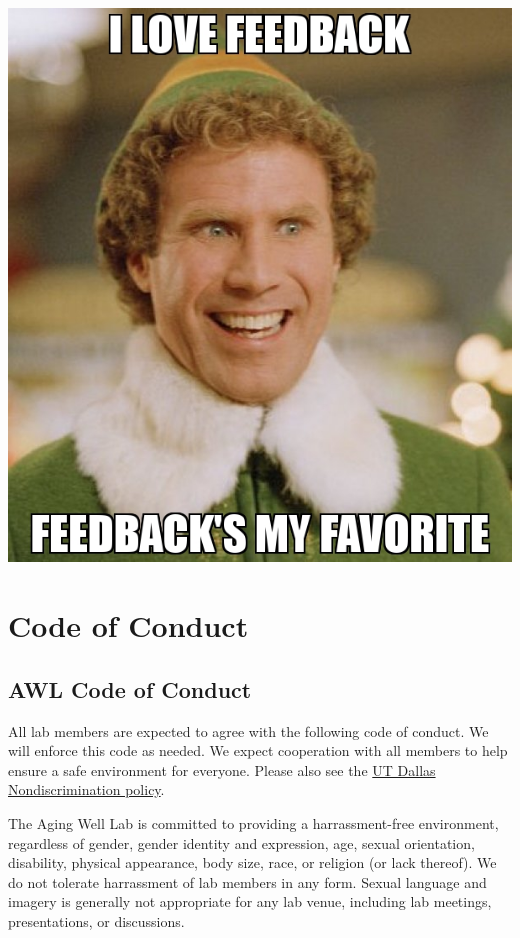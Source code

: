 \documentclass[
]{book}
\begin{document}
\includegraphics{images/i-love-feedback.jpg}

\hypertarget{code-of-conduct}{%
\chapter{Code of Conduct}\label{code-of-conduct}}

\hypertarget{awl-code-of-conduct}{%
\section{AWL Code of Conduct}\label{awl-code-of-conduct}}

All lab members are expected to agree with the following code of conduct. We will enforce this code as needed. We expect cooperation with all members to help ensure a safe environment for everyone. Please also see the \href{https://policy.utdallas.edu/utdbp3090}{UT Dallas Nondiscrimination policy}.

The Aging Well Lab is committed to providing a harrassment-free environment, regardless of gender, gender identity and expression, age, sexual orientation, disability, physical appearance, body size, race, or religion (or lack thereof). We do not tolerate harrassment of lab members in any form. Sexual language and imagery is generally not appropriate for any lab venue, including lab meetings, presentations, or discussions.
\end{document}

